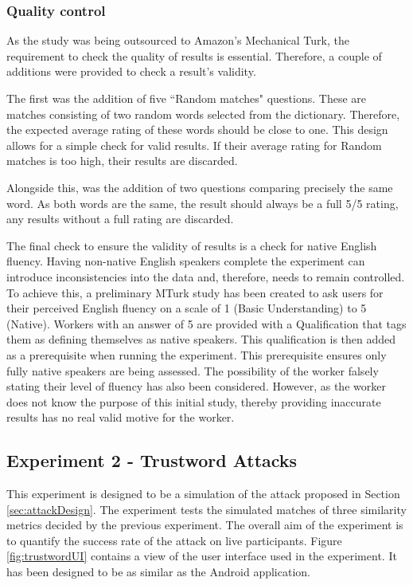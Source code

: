 \subsubsection*{Quality control}
\label{sec:exp1_qualitycontrol}
As the study was being outsourced to Amazon's Mechanical Turk, the requirement to check the quality of results is essential. Therefore, a couple of additions were provided to check a result's validity.

The first was the addition of five ``Random matches" questions. These are matches consisting of two random words selected from the dictionary. Therefore, the expected average rating of these words should be close to one. This design allows for a simple check for valid results. If their average rating for Random matches is too high, their results are discarded.

Alongside this, was the addition of two questions comparing precisely the same word. As both words are the same, the result should always be a full 5/5 rating, any results without a full rating are discarded. 

The final check to ensure the validity of results is a check for native English fluency. Having non-native English speakers complete the 
experiment can introduce inconsistencies into the 
data and, therefore, needs to remain controlled. To achieve this, a preliminary MTurk study has been created to ask users for their perceived 
English fluency on a scale of 1 (Basic Understanding) to 5 (Native). 
Workers with an answer of 5 are provided with a 
Qualification
that tags them as defining themselves as native speakers. This qualification is then 
added as a prerequisite when running the experiment. This prerequisite ensures 
only fully native speakers are being assessed. The possibility of the 
worker falsely stating their level of fluency has also been considered. 
However, as the worker does not know the purpose of this initial study,
thereby providing inaccurate results has no real valid motive for the 
worker.


\subsection{Experiment 2 - Trustword Attacks}
\label{sec:exp2_design}

This experiment is designed to be a simulation of the attack proposed in Section \ref{sec:attackDesign}. The experiment tests the simulated matches of three similarity metrics decided by the previous experiment. The overall aim of the experiment is to quantify the success rate of the attack on live participants. Figure \ref{fig:trustwordUI} contains a view of the user interface used in the experiment. It has been designed to be as similar as the \pep Android application.

